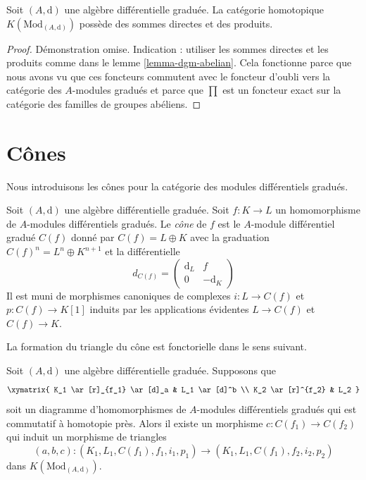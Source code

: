 \begin{lemma}
\label{lemma-homotopy-direct-sums}
Soit $(A, \text{d})$ une algèbre différentielle graduée. La
catégorie homotopique $K(\text{Mod}_{(A, \text{d})})$ possède des
sommes directes et des produits.
\end{lemma}

\begin{proof}
Démonstration omise. Indication : utiliser les sommes directes et les
produits comme dans le lemme \ref{lemma-dgm-abelian}. Cela fonctionne
parce que nous avons vu que ces foncteurs commutent avec le foncteur d'oubli vers la
catégorie des $A$-modules gradués et parce que $\prod$ est un foncteur
exact sur la catégorie des familles de groupes abéliens.
\end{proof}







\section{Cônes}
\label{section-cones}

\noindent
Nous introduisons les cônes pour la catégorie des modules différentiels gradués.

\begin{definition}
\label{definition-cone}
Soit $(A, \text{d})$ une algèbre différentielle graduée.
Soit $f : K \to L$ un homomorphisme de $A$-modules différentiels gradués. Le
{\it cône} de $f$ est le $A$-module différentiel gradué $C(f)$
donné par $C(f) = L \oplus K$ avec la graduation
$C(f)^n = L^n \oplus K^{n + 1}$ et la
différentielle
$$
d_{C(f)} =
\left(
\begin{matrix}
\text{d}_L & f \\
0 & -\text{d}_K
\end{matrix}
\right)
$$
Il est muni de morphismes canoniques de complexes $i : L \to C(f)$ et $p :
C(f) \to K[1]$ induits par les applications évidentes $L \to C(f)$
et $C(f) \to K$.
\end{definition}

\noindent
La formation du triangle du cône est fonctorielle dans le sens suivant.

\begin{lemma}
\label{lemma-functorial-cone}
Soit $(A, \text{d})$ une algèbre différentielle graduée.
Supposons que
$$
\xymatrix{
K_1 \ar[r]_{f_1} \ar[d]_a & L_1 \ar[d]^b \\
K_2 \ar[r]^{f_2} & L_2
}
$$
soit un diagramme d'homomorphismes de $A$-modules différentiels gradués
qui est commutatif à homotopie
près. Alors il existe un morphisme $c : C(f_1) \to C(f_2)$ qui induit un
morphisme de triangles
$$
(a, b, c) : (K_1, L_1, C(f_1), f_1, i_1, p_1) \to
(K_1, L_1, C(f_1), f_2, i_2, p_2)
$$
dans $K(\text{Mod}_{(A, \text{d})})$.
\end{lemma}

